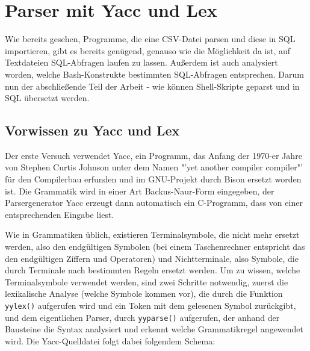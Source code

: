 \chapter{Parser mit Yacc und Lex}
Wie bereits gesehen, Programme, die eine CSV-Datei parsen und diese in SQL importieren, gibt es bereits genügend, genauso wie die Möglichkeit da ist, auf Textdateien SQL-Abfragen laufen zu lassen. Außerdem ist auch analysiert worden, welche Bash-Konstrukte bestimmten SQL-Abfragen entsprechen. Darum nun der abschließende Teil der Arbeit - wie können Shell-Skripte geparst und in SQL übersetzt werden.\\


\section{Vorwissen zu Yacc und Lex}
Der erste Versuch verwendet Yacc, ein Programm, das Anfang der 1970-er Jahre von Stephen Curtis Johnson unter dem Namen "'yet another compiler compiler"' für den Compilerbau erfunden und im GNU-Projekt durch Bison ersetzt worden ist. Die Grammatik wird in einer Art Backus-Naur-Form eingegeben, der Parsergenerator Yacc erzeugt dann automatisch ein C-Programm, dass von einer entsprechenden Eingabe liest.\cite{meinders}


Wie in Grammatiken üblich, existieren Terminalsymbole, die nicht mehr ersetzt werden, also den endgültigen Symbolen (bei einem Taschenrechner entspricht das den endgültigen Ziffern und Operatoren) und Nichtterminale, also Symbole, die durch Terminale nach bestimmten Regeln ersetzt werden.
Um zu wissen, welche Terminalsymbole verwendet werden, sind zwei Schritte notwendig, zuerst die lexikalische Analyse (welche Symbole kommen vor), die durch die Funktion \lstinline{yylex()} aufgerufen wird und ein Token mit dem gelesenen Symbol zurückgibt, und dem eigentlichen Parser, durch \lstinline{yyparse()} aufgerufen, der anhand der Bausteine die Syntax analysiert und erkennt welche Grammatikregel angewendet wird.
Die Yacc-Quelldatei folgt dabei folgendem Schema:

